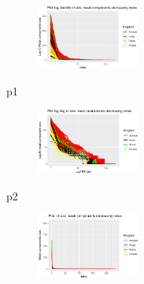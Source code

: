 \documentclass[
  letterpaper,
  DIV=11,
  numbers=noendperiod]{scrreprt}
\newenvironment{Shaded}{\begin{snugshade}}{\end{snugshade}}
\newcommand{\NormalTok}[1]{\textcolor[rgb]{0.00,0.23,0.31}{#1}}
\begin{document}
\begin{figure}[H]

{\centering \includegraphics[width=0.3\textwidth,height=\textheight]{index_files/figure-pdf/unnamed-chunk-53-1.pdf}

}

\end{figure}

\begin{Shaded}
\begin{Highlighting}[]
\NormalTok{p1}
\end{Highlighting}
\end{Shaded}

\begin{figure}[H]

{\centering \includegraphics[width=0.3\textwidth,height=\textheight]{index_files/figure-pdf/unnamed-chunk-53-2.pdf}

}

\end{figure}

\begin{Shaded}
\begin{Highlighting}[]
\NormalTok{p2}
\end{Highlighting}
\end{Shaded}

\begin{figure}[H]

{\centering \includegraphics[width=0.3\textwidth,height=\textheight]{index_files/figure-pdf/unnamed-chunk-53-3.pdf}

}

\end{figure}
\end{document}
